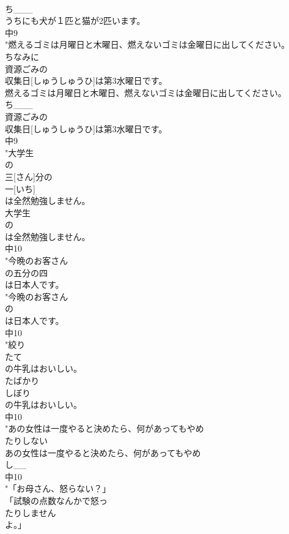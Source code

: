 \documentclass[8pt]{extreport}
\begin{document}
\begin{CJK}{UTF8}{min}
\\	ち___
\\	うちにも犬が１匹と猫が2匹います。
\\	中9
\\	"燃えるゴミは月曜日と木曜日、燃えないゴミは金曜日に出してください。
\\	ちなみに
\\	資源ごみの
\\	収集日[しゅうしゅうひ]は第3水曜日です。
\\	燃えるゴミは月曜日と木曜日、燃えないゴミは金曜日に出してください。
\\	ち___
\\	資源ごみの
\\	収集日[しゅうしゅうひ]は第3水曜日です。
\\	中9
\\	"大学生
\\	の
\\	三[さん]分の
\\	一[いち]
\\	は全然勉強しません。
\\	大学生
\\	の
\\	は全然勉強しません。
\\	中10
\\	"今晩のお客さん
\\	の五分の四
\\	は日本人です。
\\	"今晩のお客さん
\\	の
\\	は日本人です。
\\	中10
\\	"絞り
\\	たて
\\	の牛乳はおいしい。
\\	たばかり	
\\	しぼり
\\	の牛乳はおいしい。
\\	中10
\\	"あの女性は一度やると決めたら、何があってもやめ
\\	たりしない
\\	あの女性は一度やると決めたら、何があってもやめ
\\	し__
\\	中10
\\	"「お母さん、怒らない？」
\\	「試験の点数なんかで怒っ
\\	たりしません
\\	よ。」

\end{CJK}
\end{document}
